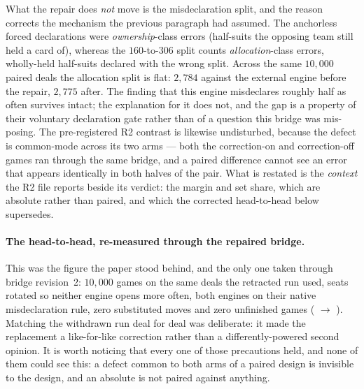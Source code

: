 \documentclass[11pt,letterpaper]{article}
\begin{document}
What the repair does \emph{not} move is the misdeclaration split, and the
reason corrects the mechanism the previous paragraph had assumed. The
anchorless forced declarations were \emph{ownership}-class errors
(half-suits the opposing team still held a card of), whereas the
$160$-to-$306$ split counts \emph{allocation}-class errors, wholly-held
half-suits declared with the wrong split. Across the same $10{,}000$ paired
deals the allocation split is flat: $2{,}784$ against the external engine before the
repair, $2{,}775$ after. The finding that this engine misdeclares roughly
half as often survives intact; the explanation for it does not, and the gap
is a property of their voluntary declaration gate rather than of a question
this bridge was mis-posing. The pre-registered R2 contrast is likewise
undisturbed,
because the defect is common-mode across its two arms --- both the
correction-on and correction-off games ran through the same bridge, and a
paired difference cannot see an error that appears identically in both
halves of the pair. What is restated is the \emph{context} the R2 file
reports beside its verdict: the margin and set share, which are absolute
rather than paired, and which the corrected head-to-head below supersedes.

\paragraph{The head-to-head, re-measured through the repaired bridge.}
\label{sec:headtohead}

\begin{center}
\end{center}

\noindent This
was the figure the paper stood behind, and the only one taken through bridge
revision~2: $10{,}000$ games on the same deals the retracted run used, seats
rotated so neither engine opens more often, both engines on their native
misdeclaration rule, zero substituted moves and zero unfinished games
( $\rightarrow$ ).
Matching the withdrawn run deal for deal was deliberate: it made the
replacement a like-for-like correction rather than a differently-powered
second opinion. It is worth noticing that every one of those precautions held,
and none of them could see this: a defect common to both arms of a paired
design is invisible to the design, and an absolute is not paired against
anything.
\end{document}
